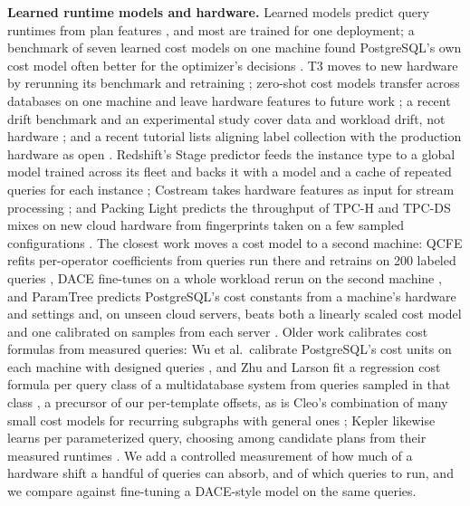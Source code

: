 \documentclass[conference]{IEEEtran}
\begin{document}
\textbf{Learned runtime models and hardware.} Learned models predict query
runtimes from plan features
\cite{ganapathi2009,akdere2012,marcus2019,sun2020,zhao2022}, and most are
trained for one deployment; a benchmark of seven learned cost models on one
machine found PostgreSQL's own cost model often better for the optimizer's
decisions \cite{heinrich2025}. T3 moves to new hardware by rerunning its
benchmark and retraining \cite{rieger2025t3}; zero-shot cost models
transfer across databases on one machine and leave hardware features to
future work \cite{hilprecht2022}; a recent drift benchmark and an
experimental study cover data and workload drift, not hardware
\cite{zhao2026neurbench,meng2026drift}; and a recent tutorial lists aligning
label collection with the production hardware as open
\cite{heinrich2025tutorial}. Redshift's Stage predictor feeds the instance
type to a global model trained across its fleet and backs it with a model
and a cache of repeated queries for each instance \cite{wu2024stage};
Costream takes hardware features as input for stream processing
\cite{heinrich2024costream}; and Packing Light predicts the throughput of
TPC-H and TPC-DS mixes on new cloud hardware from fingerprints taken on a
few sampled configurations \cite{duggan2013}. The closest work moves a cost
model to a second machine: QCFE refits per-operator coefficients from
queries run there and retrains on 200 labeled queries \cite{yan2024qcfe},
DACE fine-tunes on a whole workload rerun on the second machine
\cite{liang2024dace}, and ParamTree predicts PostgreSQL's cost constants
from a machine's hardware and settings and, on unseen cloud servers, beats
both a linearly scaled cost model and one calibrated on samples from each
server \cite{yang2023}. Older work calibrates cost formulas from measured
queries: Wu et al.\ calibrate PostgreSQL's cost units on each machine with
designed queries \cite{wu2013}, and Zhu and Larson fit a regression cost
formula per query class of a multidatabase system from queries sampled in
that class \cite{zhu1994}, a precursor of our per-template offsets, as is
Cleo's combination of many small cost models for recurring subgraphs with
general ones \cite{siddiqui2020cleo}; Kepler likewise learns per
parameterized query, choosing among candidate plans from their measured
runtimes \cite{doshi2023kepler}. We add a controlled measurement of how
much of a hardware shift a handful of queries can absorb, and of which
queries to run, and we compare against fine-tuning a DACE-style model on the
same queries.
\end{document}
